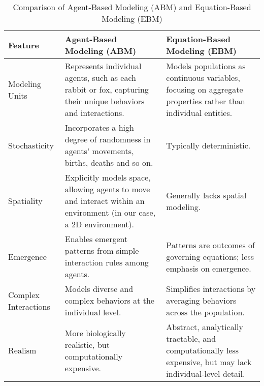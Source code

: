 \begin{table}[h]
\centering
{}
\caption{Comparison of Integration Methods}
\label{tab:integration_methods}
\end{table}



\begin{table}[h!]
    \centering
    \label{tab:diff_two_models_predator_prey}
    \begin{tabular}{|l|p{4.5cm}|p{4.5cm}|}
    \hline
    \textbf{Feature} & \textbf{Agent-Based Modeling (ABM)} & \textbf{Equation-Based Modeling (EBM)} \\
    \hline
    Modeling Units & Represents individual agents, such as each rabbit or fox, capturing their unique behaviors and interactions. & Models populations as continuous variables, focusing on aggregate properties rather than individual entities. \\
    \hline
    Stochasticity & Incorporates a high degree of randomness in agents' movements, births, deaths and so on. & Typically deterministic. \\
    \hline
    Spatiality & Explicitly models space, allowing agents to move and interact within an environment (in our case, a 2D environment). & Generally lacks spatial modeling. \\
    \hline
    Emergence & Enables emergent patterns from simple interaction rules among agents. & Patterns are outcomes of governing equations; less emphasis on emergence. \\
    \hline
    Complex Interactions & Models diverse and complex behaviors at the individual level. & Simplifies interactions by averaging behaviors across the population. \\
    \hline
    Realism & More biologically realistic, but computationally expensive. & Abstract, analytically tractable, and computationally less expensive, but may lack individual-level detail. \\
    \hline
    \end{tabular}
    \caption{Comparison of Agent-Based Modeling (ABM) and Equation-Based Modeling (EBM)}
\end{table}

